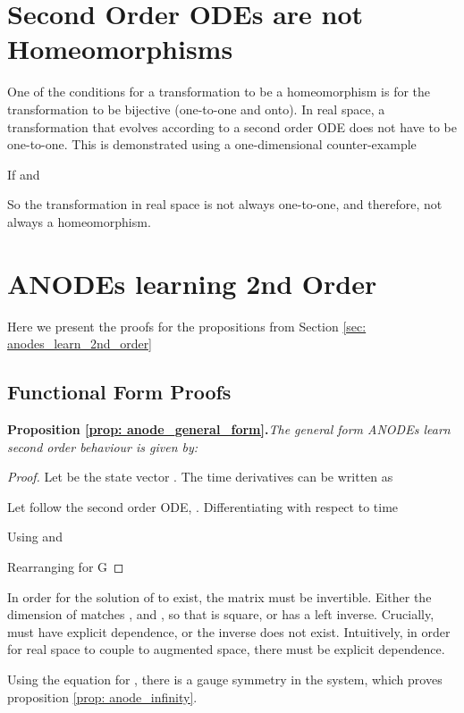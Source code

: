 \documentclass{article}
\theoremstyle{remark}
\theoremstyle{definition}
\begin{document}
\section{Second Order ODEs are not Homeomorphisms}
\label{app: sonode_not_homeomorphism}

One of the conditions for a transformation to be a homeomorphism is for the transformation to be bijective (one-to-one and onto). In real space, a transformation that evolves according to a second order ODE does not have to be one-to-one. This is demonstrated using a one-dimensional counter-example



If  and 


So the transformation in real space is not always one-to-one, and therefore, not always a homeomorphism. 

\section{ANODEs learning 2nd Order}
\label{app: anode_learn_second_order}

Here we present the proofs for the propositions from Section \ref{sec: anodes_learn_2nd_order}

\subsection{Functional Form Proofs}


\textbf{Proposition \ref{prop: anode_general_form}.}\textit{The general form ANODEs learn second order behaviour is given by:
}

\begin{proof}
Let  be the state vector . The time derivatives can be written as

Let  follow the second order ODE, . Differentiating  with respect to time

Using  and 


Rearranging for G

\end{proof}

In order for the solution of  to exist, the matrix  must be invertible. Either the dimension of  matches ,  and , so that  is square, or  has a left inverse. Crucially,  must have explicit  dependence, or the inverse does not exist. Intuitively, in order for real space to couple to augmented space, there must be explicit dependence.

Using the equation for , there is a gauge symmetry in the system, which proves proposition \ref{prop: anode_infinity}.
\end{document}
